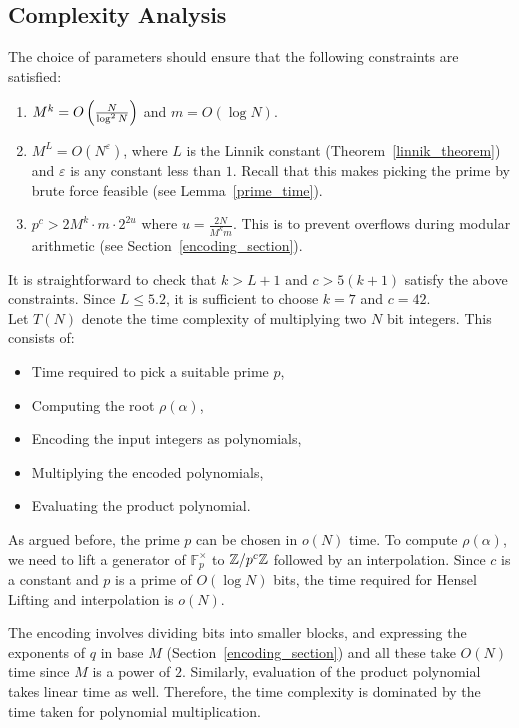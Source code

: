 \documentclass[11pt]{article}
\begin{document}
\subsection{Complexity Analysis}\label{complexity_section}

The choice of parameters should ensure that the following constraints
are satisfied:
\begin{enumerate}
\item $M^k = O\left(\frac{N}{\log^2N}\right)$ and $m = O(\log
  N)$.
\item $M^L = O(N^\varepsilon)$, where $L$ is the Linnik constant
  (Theorem~\ref{linnik_theorem}) and $\varepsilon$ is any constant less
  than $1$. Recall that this makes picking the prime by brute force
  feasible (see Lemma~\ref{prime_time}).
\item $p^c > 2M^k\cdot m\cdot 2^{2u}$ where $u = \frac{2N}{M^km}$. This
  is to prevent overflows during modular arithmetic (see
  Section~\ref{encoding_section}).
\end{enumerate}
\noindent
It is straightforward to check that $k > L+1$ and $c > 5(k+1)$ satisfy
the above constraints. Since $L\leq 5.2$, it is sufficient to choose
$k = 7$ and $c = 42$.\\


Let $T(N)$ denote the time complexity of multiplying two $N$ bit
integers. This consists of:

\begin{itemize}
\item Time required to pick a suitable prime $p$,
\item Computing the root $\rho(\alpha)$,
\item Encoding the input integers as polynomials,
\item Multiplying the encoded polynomials,
\item Evaluating the product polynomial.
\end{itemize}

As argued before, the prime $p$ can be chosen in $o(N)$ time. To
compute $\rho(\alpha)$, we need to lift a generator of
$\mathbb{F}_p^{\times}$ to $\mathbb{Z}/p^c\mathbb{Z}$ followed by an interpolation. Since $c$
is a constant and $p$ is a prime of $O(\log N)$ bits, the time
required for Hensel Lifting and interpolation is $o(N)$.

The encoding involves dividing bits into smaller blocks, and
expressing the exponents of $q$ in base $M$
(Section~\ref{encoding_section}) and all these take $O(N)$ time since
$M$ is a power of $2$. Similarly, evaluation of the product polynomial
takes linear time as well. Therefore, the time complexity is dominated
by the time taken for polynomial multiplication.
\end{document}
